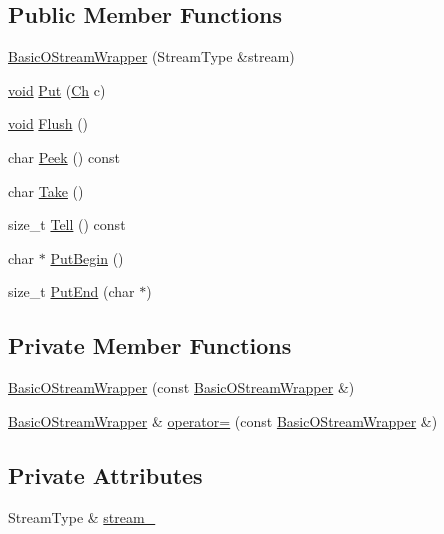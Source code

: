 \subsection*{Public Member Functions}
\begin{DoxyCompactItemize}
\item 
\hyperlink{classBasicOStreamWrapper_a067a516c13b7c9d4dacef598d32779ef}{Basic\+O\+Stream\+Wrapper} (Stream\+Type \&stream)
\item 
\hyperlink{imgui__impl__opengl3__loader_8h_ac668e7cffd9e2e9cfee428b9b2f34fa7}{void} \hyperlink{classBasicOStreamWrapper_a7d3ba9d651fbe27fe05387f512154ea8}{Put} (\hyperlink{classBasicOStreamWrapper_aafc6276f1f5cc0b8d45d137584d380bb}{Ch} c)
\item 
\hyperlink{imgui__impl__opengl3__loader_8h_ac668e7cffd9e2e9cfee428b9b2f34fa7}{void} \hyperlink{classBasicOStreamWrapper_a1c48a8b7520b0ab6ca34e665b928b56d}{Flush} ()
\item 
char \hyperlink{classBasicOStreamWrapper_a6dc18ded82487d41a2d123e21a9e050b}{Peek} () const
\item 
char \hyperlink{classBasicOStreamWrapper_a54be63e8d24f4d82329b860a907f65fe}{Take} ()
\item 
size\+\_\+t \hyperlink{classBasicOStreamWrapper_a62f214649fbfb8380a69fe92b864a61b}{Tell} () const
\item 
char $\ast$ \hyperlink{classBasicOStreamWrapper_a564b7b727bdab12185e7a7bd1ac5e822}{Put\+Begin} ()
\item 
size\+\_\+t \hyperlink{classBasicOStreamWrapper_a1da108e43a5a517c4484821fced1fca0}{Put\+End} (char $\ast$)
\end{DoxyCompactItemize}
\subsection*{Private Member Functions}
\begin{DoxyCompactItemize}
\item 
\hyperlink{classBasicOStreamWrapper_a3afe69cbc61a45e824392ca9b691c063}{Basic\+O\+Stream\+Wrapper} (const \hyperlink{classBasicOStreamWrapper}{Basic\+O\+Stream\+Wrapper} \&)
\item 
\hyperlink{classBasicOStreamWrapper}{Basic\+O\+Stream\+Wrapper} \& \hyperlink{classBasicOStreamWrapper_a6c1ce774ea7c0cab85241320de26448c}{operator=} (const \hyperlink{classBasicOStreamWrapper}{Basic\+O\+Stream\+Wrapper} \&)
\end{DoxyCompactItemize}
\subsection*{Private Attributes}
\begin{DoxyCompactItemize}
\item 
Stream\+Type \& \hyperlink{classBasicOStreamWrapper_a21f88a6682bed5b3168baca2a0802736}{stream\+\_\+}
\end{DoxyCompactItemize}


